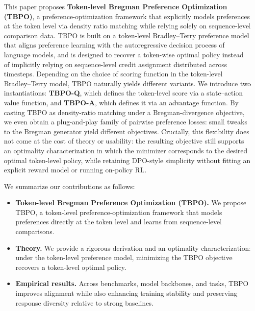 \documentclass{article}
\theoremstyle{plain}
\theoremstyle{definition}
\theoremstyle{remark}
\begin{document}
This paper proposes \textbf{Token-level Bregman Preference Optimization (TBPO)}, a preference-optimization framework that explicitly models preferences at the token level via density ratio matching while relying solely on sequence-level comparison data. TBPO is built on a token-level Bradley--Terry preference model that aligns preference learning with the autoregressive decision process of language models, and is designed to recover a token-wise optimal policy instead of implicitly relying on sequence-level credit assignment distributed across timesteps. Depending on the choice of scoring function in the token-level Bradley--Terry model, TBPO naturally yields different variants. We introduce two instantiations: \textbf{TBPO-Q}, which defines the token-level score via a state--action value function, and \textbf{TBPO-A}, which defines it via an advantage function. By casting TBPO as density-ratio matching under a Bregman-divergence objective, we even obtain a plug-and-play family of pairwise preference losses: small tweaks to the Bregman generator yield different objectives. Crucially, this flexibility does not come at the cost of theory or usability: the resulting objective still supports an optimality characterization in which the minimizer corresponds to the desired optimal token-level policy, while retaining DPO-style simplicity without fitting an explicit reward model or running on-policy RL.



We summarize our contributions as follows:
\begin{itemize}
    \item \textbf{Token-level Bregman Preference Optimization (TBPO).}
    We propose TBPO, a token-level preference-optimization framework that models preferences directly at the token level and learns from sequence-level comparisons.
    \item \textbf{Theory.}
    We provide a rigorous derivation and an optimality characterization: under the token-level preference model, minimizing the TBPO objective recovers a token-level optimal policy.
    \item \textbf{Empirical results.}
    Across benchmarks, model backbones, and tasks, TBPO improves alignment while also enhancing training stability and preserving response diversity relative to strong baselines.
\end{itemize}
\end{document}
